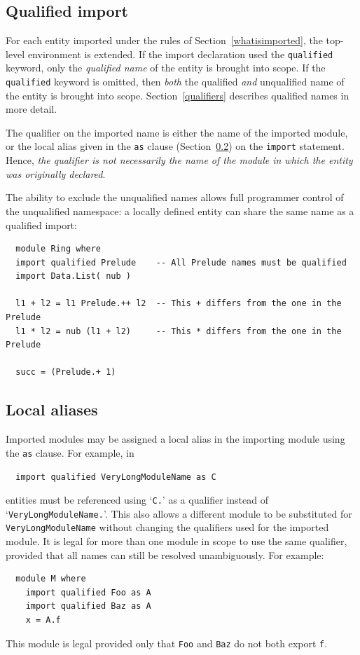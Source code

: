 \subsection{Qualified import}

For each entity imported under the rules of Section~\ref{whatisimported},
the top-level environment is extended.  If the import declaration used
the \mbox{\tt qualified} keyword, only the {\em qualified name} of the entity is
brought into scope.  If the \mbox{\tt qualified} keyword is omitted, then {\em both} the
qualified {\em and} unqualified name of the entity is brought into scope.
Section~\ref{qualifiers} describes qualified names in more detail.

The qualifier on the imported name is either the name of the imported module,
or the local alias given in the \mbox{\tt as} clause (Section~\ref{as-clause}) 
on the \mbox{\tt import} statement.
Hence, {\em the qualifier is not necessarily the name of the module in which the
entity was originally declared}.

The ability to exclude the unqualified names allows full programmer control of
the unqualified namespace: a locally defined entity can share the same
name as a qualified import:
\par
{\small
\bprog
{\small\begin{verbatim}
  module Ring where
  import qualified Prelude    -- All Prelude names must be qualified
  import Data.List( nub )

  l1 + l2 = l1 Prelude.++ l2  -- This + differs from the one in the Prelude
  l1 * l2 = nub (l1 + l2)     -- This * differs from the one in the Prelude

  succ = (Prelude.+ 1)
\end{verbatim}}
\eprog
}

\subsection{Local aliases}
\label{as-clause}

Imported modules may be assigned a local alias in the importing module
using the \mbox{\tt as} clause.
For example, in
\bprog
{\small\begin{verbatim}
  import qualified VeryLongModuleName as C
\end{verbatim}}
\eprog
entities must be referenced using `\mbox{\tt C.}' as a qualifier instead of
`\mbox{\tt VeryLongModuleName.}'.  This also allows a different module to be substituted
for \mbox{\tt VeryLongModuleName} without changing the qualifiers used for the imported module.
It is legal for more than one module in scope to 
use the same qualifier, provided that all names can still be resolved unambiguously.
For example:
\bprog
{\small\begin{verbatim}
  module M where
    import qualified Foo as A
    import qualified Baz as A
    x = A.f
\end{verbatim}}
\eprog
This module is legal provided only that \mbox{\tt Foo} and \mbox{\tt Baz} do not both export \mbox{\tt f}.


